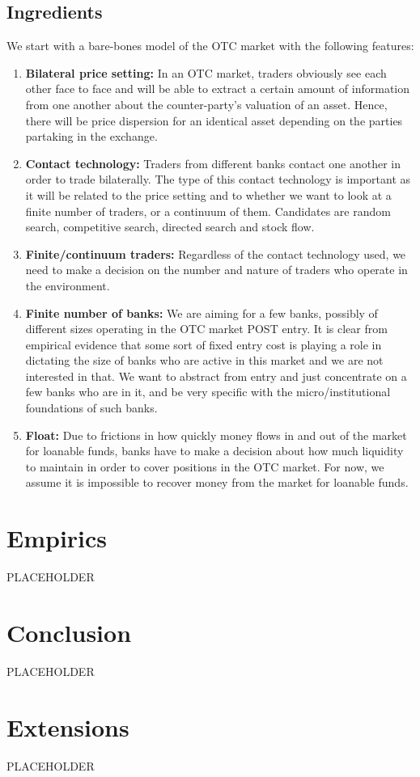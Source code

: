 \documentclass [12pt] {article}
\begin{document}
\subsection{Ingredients}
We start with a bare-bones model of the OTC market with the following features:
\begin{enumerate}
\item \textbf{Bilateral price setting: } In an OTC market, traders obviously see each other face to face and will be able to extract a certain amount of information from one another about the counter-party's valuation of an asset. Hence, there will be price dispersion for an identical asset depending on the parties partaking in the exchange. 
\item \textbf{Contact technology: } Traders from different banks contact one another in order to trade bilaterally. The type of this contact technology is important as it will be related to the price setting and to whether we want to look at a finite number of traders, or a continuum of them. Candidates are random search, competitive search, directed search and stock flow. 
\item \textbf{Finite/continuum traders: } Regardless of the contact technology used, we need to make a decision on the number and nature of traders who operate in the environment. 
\item \textbf{Finite number of banks: } We are aiming for a few banks, possibly of different sizes operating in the OTC market POST entry. It is clear from empirical evidence that some sort of fixed entry cost is playing a role in dictating the size of banks who are active in this market and we are not interested in that. We want to abstract from entry and just concentrate on a few banks who are in it, and be very specific with the micro/institutional foundations of such banks.
\item \textbf{Float: } Due to frictions in how quickly money flows in and out of the market for loanable funds, banks have to make a decision about how much liquidity to maintain in order to cover positions in the OTC market. For now, we assume it is impossible to recover money from the market for loanable funds. 
\end{enumerate}

\section{Empirics}
PLACEHOLDER

\section{Conclusion}
PLACEHOLDER

\section{Extensions}
PLACEHOLDER




%
\end{document}

